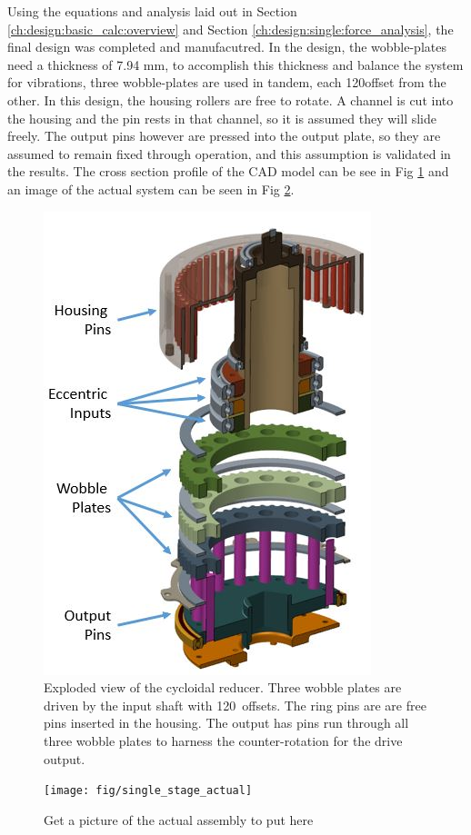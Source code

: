 Using the equations and analysis laid out in Section \ref{ch:design:basic_calc:overview} and Section \ref{ch:design:single:force_analysis}, the final design was completed and manufacutred. In the design, the wobble-plates need a thickness of 7.94 mm, to accomplish this thickness and balance the system for vibrations, three wobble-plates are used in tandem, each 120\textdegree offset from the other. In this design, the housing rollers are free to rotate. A channel is cut into the housing and the pin rests in that channel, so it is assumed they will slide freely. The output pins however are pressed into the output plate, so they are assumed to remain fixed through operation, and this assumption is validated in the results. The cross section profile of the CAD model can be see in Fig \ref{fig:single_stage} and an image of the actual system can be seen in Fig \ref{fig:single_stage_actual}.

\begin{figure}
   \centering
   \includegraphics[width=0.5\linewidth]{fig/exploded_labeled}
   \caption{Exploded view of the cycloidal reducer.
   Three wobble plates are driven by the input shaft with 120\textdegree\ offsets.
   The ring pins are are free pins inserted in the housing.
   The output has pins run through all three wobble plates to harness the counter-rotation for the drive output.}
   \label{fig:single_stage}
\end{figure}

\begin{figure}
   \centering
   \texttt{[image: fig/single\_stage\_actual]}
   \caption{Get a picture of the actual assembly to put here}
   \label{fig:single_stage_actual}
\end{figure}



